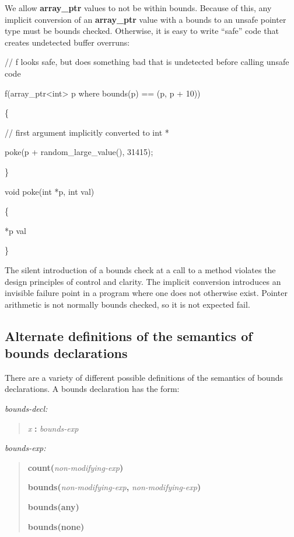 \documentclass[]{article}
\begin{document}
We allow \textbf{array\_ptr} values to not be within bounds. Because of
this, any implicit conversion of an \textbf{array\_ptr} value with a
bounds to an unsafe pointer type must be bounds checked. Otherwise, it
is easy to write ``safe'' code that creates undetected buffer overruns:

// f looks safe, but does something bad that is undetected before
calling unsafe code

f(array\_ptr\textless{}int\textgreater{} p where bounds(p) == (p, p +
10))

\{

// first argument implicitly converted to int *

poke(p + random\_large\_value(), 31415);

\}

void poke(int *p, int val)

\{

*p val

\}

The silent introduction of a bounds check at a call to a method violates
the design principles of control and clarity. The implicit conversion
introduces an invisible failure point in a program where one does not
otherwise exist. Pointer arithmetic is not normally bounds checked, so
it is not expected fail.

\subsection{\texorpdfstring{\protect\hypertarget{ux5fToc435435019}{}{\protect\hypertarget{ux5fToc437460854}{}{\protect\hypertarget{ux5fToc440445535}{}{\protect\hypertarget{ux5fToc440449317}{}{\protect\hypertarget{ux5fToc440551967}{}{}}}}}Alternate
definitions of the semantics of bounds
declarations}{Alternate definitions of the semantics of bounds declarations}}\label{alternate-definitions-of-the-semantics-of-bounds-declarations}

There are a variety of different possible definitions of the semantics
of bounds declarations. A bounds declaration has the form:

\emph{bounds-decl:}

\begin{quote}
\emph{x} \textbf{:} \emph{bounds-exp}
\end{quote}

\emph{bounds-exp:}

\begin{quote}
\textbf{count(}\emph{non-modifying-exp}\textbf{)}

\textbf{bounds(}\emph{non-modifying-exp}\textbf{,}
\emph{non-modifying-exp}\textbf{)}

\textbf{bounds(any)}

\textbf{bounds(none)}
\end{quote}
\end{document}
